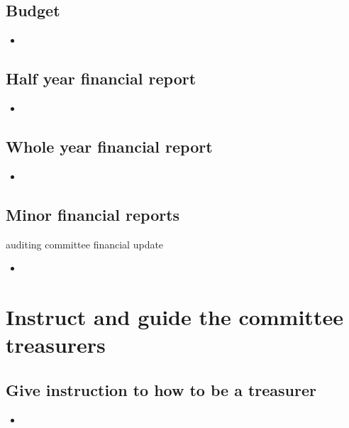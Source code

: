 \documentclass{report}
\begin{document}
\subsection{Budget}

\begin{itemize} 
\vspace{-1mm}
\itemsep-1mm 
\item 
\end{itemize}

\subsection{Half year financial report}

\begin{itemize} 
\vspace{-1mm}
\itemsep-1mm 
\item 
\end{itemize}

\subsection{Whole year financial report}

\begin{itemize} 
\vspace{-1mm}
\itemsep-1mm 
\item 
\end{itemize}

\subsection{Minor financial reports}
auditing committee
financial update
\begin{itemize} 
\vspace{-1mm}
\itemsep-1mm 
\item 
\end{itemize}

\section{Instruct and guide the committee treasurers}

\subsection{Give instruction to how to be a treasurer}
\begin{itemize} 
\vspace{-1mm}
\itemsep-1mm 
\item 
\end{itemize}
\end{document}
